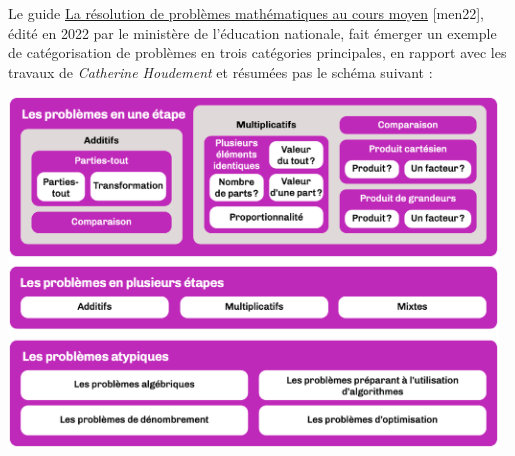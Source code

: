 Le guide \og \href{https://eduscol.education.fr/document/32206/download?attachment}{\blue La résolution de problèmes mathématiques au cours moyen} \fg{} [men22], édité en 2022 par le ministère de l'éducation nationale, fait émerger un exemple de catégorisation de problèmes en trois catégories principales, en rapport avec les travaux de {\it Catherine Houdement} et résumées pas le schéma suivant :
   \begin{center}
      \includegraphics[width=13cm]{Nombres_et_calculs_did/Images/Num2_cours_tableau_problemes}
   \end{center}

